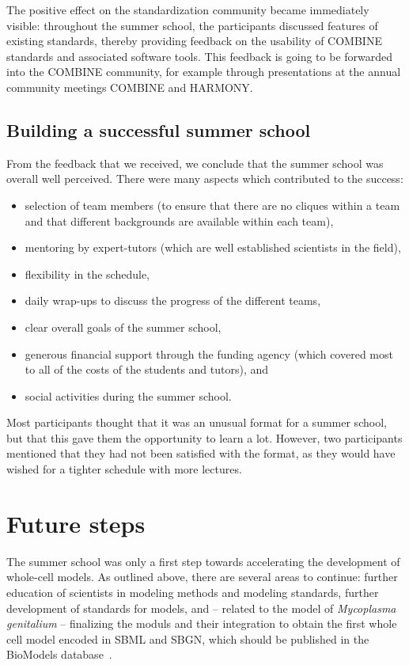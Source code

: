 \documentclass[journal,transmag]{IEEEtran}
\begin{document}
The positive effect on the standardization community became immediately visible:
throughout the summer school, the participants discussed features of existing standards, thereby providing feedback on the usability of COMBINE standards and associated software tools.
This feedback is going to be forwarded into the COMBINE community, for example through presentations at the annual community meetings COMBINE and HARMONY.

\subsection{Building a successful summer school}
From the feedback that we received, we conclude that the summer school was overall well perceived. 
There were many aspects which contributed to the success: 
\begin{itemize}
\item selection of team members (to ensure that there are no cliques within a team and that different backgrounds are available within each team), 
\item mentoring by expert-tutors (which are well established scientists in the field), 
\item flexibility in the schedule, 
\item daily wrap-ups to discuss the progress of the different teams, 
\item clear overall goals of the summer school,
\item generous financial support through the funding agency (which covered most to all of the costs of the students and tutors), and 
\item social activities during the summer school.
\end{itemize}
Most participants thought that it was an unusual format for  a summer school, but that this gave them the opportunity to learn a lot. 
However, two participants mentioned that they had not been satisfied with the format, as they would have wished for a tighter schedule with more lectures. 

\section{Future steps}

The summer school was only a first step towards accelerating the development of whole-cell models. 
As outlined above, there are several areas to continue: further education of scientists in modeling methods and modeling standards, further development of standards for models, and -- related to the model of \textit{Mycoplasma genitalium} -- finalizing the moduls and their integration to obtain the first whole cell model encoded in SBML and SBGN, which should be published in the BioModels database~\cite{li2010biomodels}. 
\end{document}
